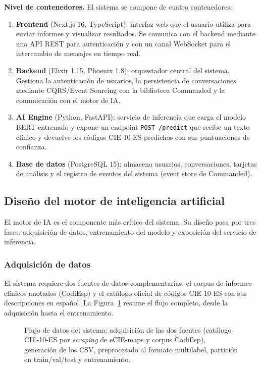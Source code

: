 \textbf{Nivel de contenedores.} El sistema se compone de cuatro contenedores:

\begin{enumerate}
 \item \textbf{Frontend} (Next.js 16, TypeScript): interfaz web que el usuario utiliza para enviar informes y visualizar resultados. Se comunica con el backend mediante una API REST para autenticación y con un canal WebSocket para el intercambio de mensajes en tiempo real.
 \item \textbf{Backend} (Elixir 1.15, Phoenix 1.8): orquestador central del sistema. Gestiona la autenticación de usuarios, la persistencia de conversaciones mediante CQRS/Event Sourcing con la biblioteca Commanded y la comunicación con el motor de IA.
 \item \textbf{AI Engine} (Python, FastAPI): servicio de inferencia que carga el modelo BERT entrenado y expone un endpoint \texttt{POST /predict} que recibe un texto clínico y devuelve los códigos CIE-10-ES predichos con sus puntuaciones de confianza.
 \item \textbf{Base de datos} (PostgreSQL 15): almacena usuarios, conversaciones, tarjetas de análisis y el registro de eventos del sistema (event store de Commanded).
\end{enumerate}

\subsection{Diseño del motor de inteligencia artificial}

El motor de IA es el componente más crítico del sistema. Su diseño pasa por tres fases: adquisición de datos, entrenamiento del modelo y exposición del servicio de inferencia.

\subsubsection{Adquisición de datos}
\label{sec:adquisicion}

El sistema requiere dos fuentes de datos complementarias: el corpus de informes clínicos anotados (CodiEsp) y el catálogo oficial de códigos CIE-10-ES con sus descripciones en español. La Figura~\ref{fig:pipeline-datos} resume el flujo completo, desde la adquisición hasta el entrenamiento.

\begin{figure}[ht]
\centering
\resizebox{\textwidth}{!}{}
\caption{Flujo de datos del sistema: adquisición de las dos fuentes (catálogo CIE-10-ES por \emph{scraping} de eCIE-maps y corpus CodiEsp), generación de los CSV, preprocesado al formato multilabel, partición en train/val/test y entrenamiento.}
\label{fig:pipeline-datos}
\end{figure}

